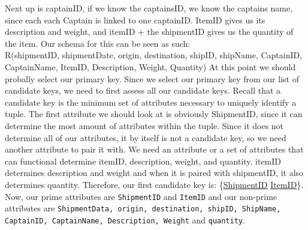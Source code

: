 \documentclass{report}
\begin{document}
\bigbreak \noindent
Next up is captainID, if we know the captainsID, we know the captains name, since each each Captain is linked to one captainID.
\bigbreak \noindent
ItemID gives us its description and weight, and itemID + the shipmentID gives us the quantity of the item.
\bigbreak \noindent
Our schema for this can be seen as such: \\
R(shipmentID, shipmentDate, origin, destination, shipID, shipName, CaptainID, CaptainName, ItemID, Description, Weight, Quantity) 
\bigbreak \noindent
At this point we should probally select our primary key. Since we select our primary key from our list of candidate keys, we need to first assess all our candidate keys. Recall that a candidate key is the minimum set of attributes necessary to uniquely identify a tuple. 
\bigbreak \noindent
The first attribute we should look at is obviously ShipmentID, since it can determine the most amount of attributes within the tuple. Since it does not determine all of our attributes, it by itself is not a candidate key, so we need another attribute to pair it with. We need an attribute or a set of attributes that can functional determine itemID, description, weight, and quantity. itemID determines description and weight and when it is paired with shipmentID, it also determines quantity. Therefore, our first candidate key is: \{\underline{ShipmentID} \underline{ItemID}\}.
\bigbreak \noindent
Now, our prime attributes are \texttt{ShipmentID} and \texttt{ItemID} and our non-prime attributes are \texttt{ShipmentData, origin, destination, shipID, ShipName, CaptainID, CaptainName, Description, Weight} and \texttt{quantity}.

 


\end{document}
